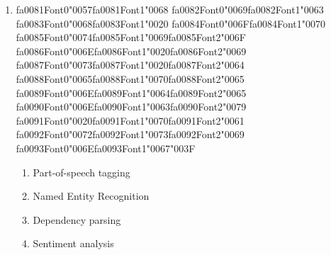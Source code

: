 \documentclass[12pt]{article}
\begin{document}
\begin{enumerate}[label=Q\arabic*.]
\item {\csname fa0081Font0\endcsname\char"0057}{\csname fa0081Font1\endcsname\char"0068} {\csname fa0082Font0\endcsname\char"0069}{\csname fa0082Font1\endcsname\char"0063} {\csname fa0083Font0\endcsname\char"0068}{\csname fa0083Font1\endcsname\char"0020} {\csname fa0084Font0\endcsname\char"006F}{\csname fa0084Font1\endcsname\char"0070} {\csname fa0085Font0\endcsname\char"0074}{\csname fa0085Font1\endcsname\char"0069}{\csname fa0085Font2\endcsname\char"006F} {\csname fa0086Font0\endcsname\char"006E}{\csname fa0086Font1\endcsname\char"0020}{\csname fa0086Font2\endcsname\char"0069} {\csname fa0087Font0\endcsname\char"0073}{\csname fa0087Font1\endcsname\char"0020}{\csname fa0087Font2\endcsname\char"0064} {\csname fa0088Font0\endcsname\char"0065}{\csname fa0088Font1\endcsname\char"0070}{\csname fa0088Font2\endcsname\char"0065} {\csname fa0089Font0\endcsname\char"006E}{\csname fa0089Font1\endcsname\char"0064}{\csname fa0089Font2\endcsname\char"0065} {\csname fa0090Font0\endcsname\char"006E}{\csname fa0090Font1\endcsname\char"0063}{\csname fa0090Font2\endcsname\char"0079} {\csname fa0091Font0\endcsname\char"0020}{\csname fa0091Font1\endcsname\char"0070}{\csname fa0091Font2\endcsname\char"0061} {\csname fa0092Font0\endcsname\char"0072}{\csname fa0092Font1\endcsname\char"0073}{\csname fa0092Font2\endcsname\char"0069} {\csname fa0093Font0\endcsname\char"006E}{\csname fa0093Font1\endcsname\char"0067}{\char"003F}
\begin{enumerate}[label=(\Alph*)]
    \item Part-of-speech tagging
    \item Named Entity Recognition
    \item Dependency parsing
    \item Sentiment analysis
\end{enumerate}

\end{enumerate}
\end{document}
